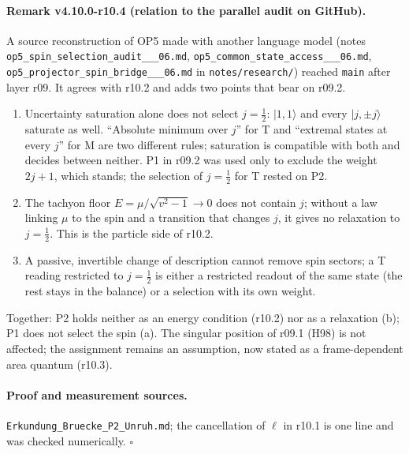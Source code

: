 \paragraph{Remark v4.10.0-r10.4 (relation to the parallel audit on GitHub).}
A source reconstruction of OP5 made with another language model (notes \texttt{op5\_\allowbreak spin\_\allowbreak selection\_\allowbreak audit\_\_\_\allowbreak 06.md},
\texttt{op5\_\allowbreak common\_\allowbreak state\_\allowbreak access\_\_\_\allowbreak 06.md}, \texttt{op5\_\allowbreak projector\_\allowbreak spin\_\allowbreak bridge\_\_\_\allowbreak 06.md} in
\texttt{notes/\allowbreak research/}) reached \texttt{main} after layer r09.  It agrees with r10.2 and adds two points that bear on r09.2.
\begin{enumerate}[leftmargin=2em]
\item[(a)] Uncertainty saturation alone does not select \(j=\tfrac12\): \(|1,1\rangle\) and every \(|j,\pm j\rangle\) saturate as well.  ``Absolute minimum over \(j\)'' for T and
``extremal states at every \(j\)'' for M are two different rules; saturation is compatible with both and decides between neither.  P1 in r09.2 was used
only to exclude the weight \(2j+1\), which stands; the selection of \(j=\tfrac12\) for T rested on P2.
\item[(b)] The tachyon floor \(E=\mu/\sqrt{v^2-1}\to0\) does not contain \(j\); without a law linking \(\mu\) to the spin and a transition that changes \(j\), it gives no
relaxation to \(j=\tfrac12\).  This is the particle side of r10.2.
\item[(c)] A passive, invertible change of description cannot remove spin sectors; a T reading restricted to \(j=\tfrac12\) is either a restricted readout of the
same state (the rest stays in the balance) or a selection with its own weight.
\end{enumerate}
Together: P2 holds neither as an energy condition (r10.2) nor as a relaxation (b); P1 does not select the spin (a).  The singular position of r09.1 (H98)
is not affected; the assignment remains an assumption, now stated as a frame-dependent area quantum (r10.3).

\paragraph{Proof and measurement sources.}
\texttt{Erkundung\_\allowbreak Bruecke\_\allowbreak P2\_\allowbreak Unruh.md}; the cancellation of \(\ell\) in r10.1 is one line and was checked numerically.  \(\square\)

